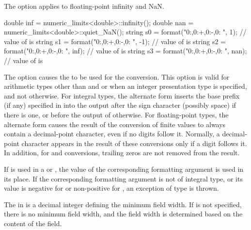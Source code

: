 \pnum
The  option applies to floating-point infinity and NaN.
\begin{example}
\begin{codeblock}
double inf = numeric_limits<double>::infinity();
double nan = numeric_limits<double>::quiet_NaN();
string s0 = format("{0:},{0:+},{0:-},{0: }", 1);        // value of  is 
string s1 = format("{0:},{0:+},{0:-},{0: }", -1);       // value of  is 
string s2 = format("{0:},{0:+},{0:-},{0: }", inf);      // value of  is 
string s3 = format("{0:},{0:+},{0:-},{0: }", nan);      // value of  is 
\end{codeblock}
\end{example}

\pnum
The \tcode{\#} option causes the
to be used for the conversion.
This option is valid for arithmetic types other than
 and 
or when an integer presentation type is specified, and not otherwise.
For integral types,
the alternate form inserts the
base prefix (if any) specified in 
into the output after the sign character (possibly space) if there is one, or
before the output of  otherwise.
For floating-point types,
the alternate form causes the result of the conversion of finite values
to always contain a decimal-point character,
even if no digits follow it.
Normally, a decimal-point character appears in the result of these
conversions only if a digit follows it.
In addition, for  and  conversions,
trailing zeros are not removed from the result.

\pnum
If  is used in
a  or ,
the value of the corresponding formatting argument is used in its place.
If the corresponding formatting argument is not of integral type, or
its value is
negative for  or
non-positive for ,
an exception of type  is thrown.

\pnum
The  in
 is a decimal integer defining the minimum field width.
If  is not specified,
there is no minimum field width, and
the field width is determined based on the content of the field.

